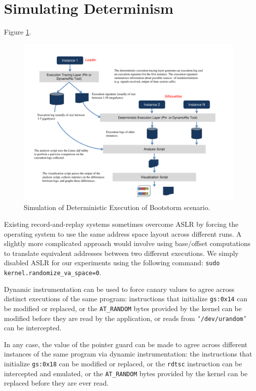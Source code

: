 \section{Simulating Determinism} \label{ch3:simulation}
Figure \ref{ch3:simulation}.

\begin{figure}[h]
  \center
  \includegraphics[scale=0.7, trim=1cm 1cm 1cm 1cm]
                  {simulation.pdf}
  \caption[Simulation of Deterministic Execution of Bootstorm scenario]%
  {Simulation of Deterministic Execution of Bootstorm scenario.}
  \label{ch3:simulation}
\end{figure}

Existing record-and-replay systems sometimes overcome ASLR by
forcing the operating system to use the same address space layout across
different runs. A slightly more complicated approach would involve
using base/offset computations to translate equivalent 
addresses between two different executions. 
We simply disabled ASLR for our experiments using the following command:
\texttt {sudo kernel.randomize\_va\_space=0}.



Dynamic instrumentation can be used to force canary values
to agree across distinct executions of the same program:
instructions that initialize \texttt{gs:0x14} can be
modified or replaced, or the \texttt{AT\_RANDOM} bytes provided by the kernel can be
modified before they are read by the application, or reads from \texttt{`/dev/urandom'} can be 
intercepted.

 In any case, the value of the pointer
guard can be made to agree across different instances
of the same program via dynamic instrumentation: 
the instructions that initialize \texttt{gs:0x18} can
be modified or replaced, or the \texttt{rdtsc} instruction
can be intercepted and emulated, or the  \texttt{AT\_RANDOM} bytes provided by the kernel can be
replaced before they are ever read.

